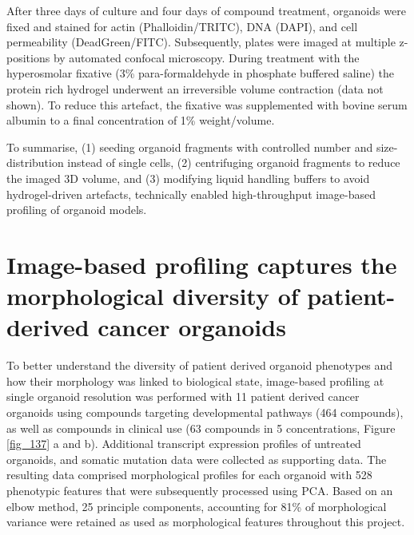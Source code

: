 \begin{flushleft}
After three days of culture and four days of compound treatment, organoids were fixed and stained for actin (Phalloidin/TRITC), DNA (DAPI), and cell permeability (DeadGreen/FITC). Subsequently, plates were imaged at multiple z-positions by automated confocal microscopy. During treatment with the hyperosmolar fixative (3\% para-formaldehyde in phosphate buffered saline) the protein rich hydrogel underwent an irreversible volume contraction (data not shown). To reduce this artefact, the fixative was supplemented with bovine serum albumin to a final concentration of 1\% weight/volume.
\par
To summarise, (1) seeding organoid fragments with controlled number and size-distribution instead of single cells, (2) centrifuging organoid fragments to reduce the imaged 3D volume, and (3) modifying liquid handling buffers to avoid hydrogel-driven artefacts, technically enabled high-throughput image-based profiling of organoid models. 
\bigbreak

\newpage

\section{Image-based profiling captures the morphological diversity of patient-derived cancer organoids}

To better understand the diversity of patient derived organoid phenotypes and how their morphology was linked to biological state, image-based profiling at single organoid resolution was performed with 11 patient derived cancer organoids using compounds targeting developmental pathways (464 compounds), as well as compounds in clinical use (63 compounds in 5 concentrations, Figure \ref{fig_137} a and b). Additional transcript expression profiles of untreated organoids, and somatic mutation data were collected as supporting data. The resulting data comprised morphological profiles for each organoid with 528 phenotypic features that were subsequently processed using PCA. Based on an elbow method, 25 principle components, accounting for 81\% of morphological variance were retained as used as morphological features throughout this project. 


\end{flushleft}
